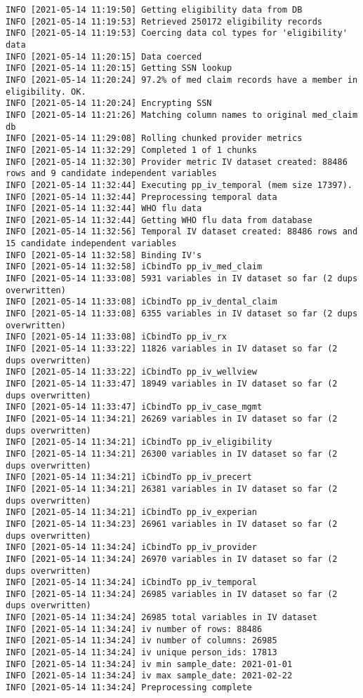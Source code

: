 \documentclass[
]{book}
\begin{document}
\begin{verbatim}
INFO [2021-05-14 11:19:50] Getting eligibility data from DB
INFO [2021-05-14 11:19:53] Retrieved 250172 eligibility records
INFO [2021-05-14 11:19:53] Coercing data col types for 'eligibility' data
INFO [2021-05-14 11:20:15] Data coerced
INFO [2021-05-14 11:20:15] Getting SSN lookup
INFO [2021-05-14 11:20:24] 97.2% of med claim records have a member in eligibility. OK.
INFO [2021-05-14 11:20:24] Encrypting SSN
INFO [2021-05-14 11:21:26] Matching column names to original med_claim db
INFO [2021-05-14 11:29:08] Rolling chunked provider metrics
INFO [2021-05-14 11:32:29] Completed 1 of 1 chunks
INFO [2021-05-14 11:32:30] Provider metric IV dataset created: 88486 rows and 9 candidate independent variables
INFO [2021-05-14 11:32:44] Executing pp_iv_temporal (mem size 17397).
INFO [2021-05-14 11:32:44] Preprocessing temporal data
INFO [2021-05-14 11:32:44] WHO flu data
INFO [2021-05-14 11:32:44] Getting WHO flu data from database
INFO [2021-05-14 11:32:56] Temporal IV dataset created: 88486 rows and 15 candidate independent variables
INFO [2021-05-14 11:32:58] Binding IV's
INFO [2021-05-14 11:32:58] iCbindTo pp_iv_med_claim
INFO [2021-05-14 11:33:08] 5931 variables in IV dataset so far (2 dups overwritten)
INFO [2021-05-14 11:33:08] iCbindTo pp_iv_dental_claim
INFO [2021-05-14 11:33:08] 6355 variables in IV dataset so far (2 dups overwritten)
INFO [2021-05-14 11:33:08] iCbindTo pp_iv_rx
INFO [2021-05-14 11:33:22] 11826 variables in IV dataset so far (2 dups overwritten)
INFO [2021-05-14 11:33:22] iCbindTo pp_iv_wellview
INFO [2021-05-14 11:33:47] 18949 variables in IV dataset so far (2 dups overwritten)
INFO [2021-05-14 11:33:47] iCbindTo pp_iv_case_mgmt
INFO [2021-05-14 11:34:21] 26269 variables in IV dataset so far (2 dups overwritten)
INFO [2021-05-14 11:34:21] iCbindTo pp_iv_eligibility
INFO [2021-05-14 11:34:21] 26300 variables in IV dataset so far (2 dups overwritten)
INFO [2021-05-14 11:34:21] iCbindTo pp_iv_precert
INFO [2021-05-14 11:34:21] 26381 variables in IV dataset so far (2 dups overwritten)
INFO [2021-05-14 11:34:21] iCbindTo pp_iv_experian
INFO [2021-05-14 11:34:23] 26961 variables in IV dataset so far (2 dups overwritten)
INFO [2021-05-14 11:34:24] iCbindTo pp_iv_provider
INFO [2021-05-14 11:34:24] 26970 variables in IV dataset so far (2 dups overwritten)
INFO [2021-05-14 11:34:24] iCbindTo pp_iv_temporal
INFO [2021-05-14 11:34:24] 26985 variables in IV dataset so far (2 dups overwritten)
INFO [2021-05-14 11:34:24] 26985 total variables in IV dataset
INFO [2021-05-14 11:34:24] iv number of rows: 88486
INFO [2021-05-14 11:34:24] iv number of columns: 26985
INFO [2021-05-14 11:34:24] iv unique person_ids: 17813
INFO [2021-05-14 11:34:24] iv min sample_date: 2021-01-01
INFO [2021-05-14 11:34:24] iv max sample_date: 2021-02-22
INFO [2021-05-14 11:34:24] Preprocessing complete
\end{verbatim}
\end{document}
